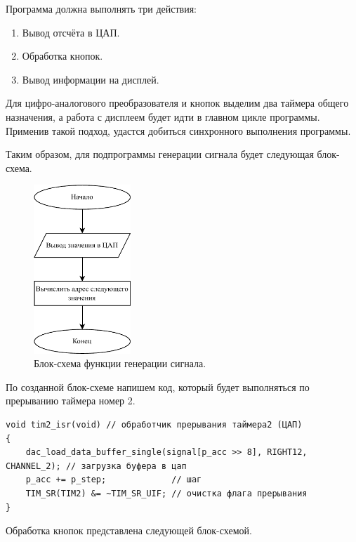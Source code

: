 	Программа должна выполнять три действия:
	
	\begin{enumerate}
		\item Вывод отсчёта в ЦАП.
		\item Обработка кнопок.
		\item Вывод информации на дисплей.
	\end{enumerate}
	
	
	Для цифро-аналогового преобразователя и кнопок выделим два таймера общего назначения, а работа с дисплеем будет идти в главном цикле программы. Применив такой подход, удастся добиться синхронного выполнения программы. 
	
	Таким образом, для подпрограммы генерации сигнала будет следующая блок-схема.
	
	\begin{figure}[H]
    \centering
    \includegraphics[width=0.325\textwidth]{../image/dac.pdf}
    \caption{Блок-схема функции генерации сигнала.}
	\end{figure}
	
	По созданной блок-схеме напишем код, который будет выполняться по прерыванию таймера номер 2.
	
\begin{code}
\begin{verbatim}
void tim2_isr(void) // обработчик прерывания таймера2 (ЦАП)
{
    dac_load_data_buffer_single(signal[p_acc >> 8], RIGHT12, CHANNEL_2); // загрузка буфера в цап
    p_acc += p_step;             // шаг
    TIM_SR(TIM2) &= ~TIM_SR_UIF; // очистка флага прерывания
}
\end{verbatim}
\end{code}
	
	Обработка кнопок представлена следующей блок-схемой.	
	
